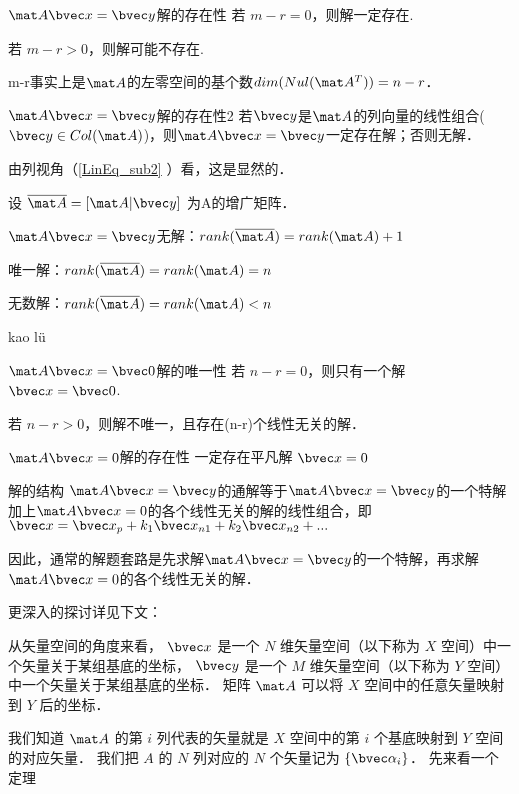 \begin{theorem}{$\mat A \bvec x=\bvec y$解的存在性}
若 $m-r=0$，则解一定存在.

若 $m-r>0$，则解可能不存在.
\end{theorem}
m-r事实上是$\mat A$的左零空间的基个数$dim(Nul(\mat A^T))=n-r$．

\begin{theorem}{$\mat A \bvec x=\bvec y$解的存在性2}
若$\bvec y$是$\mat A$的列向量的线性组合($\bvec y \in Col(\mat A)$)，则$\mat A \bvec x=\bvec y$一定存在解；否则无解．
\end{theorem}
由列视角（\autoref{LinEq_sub2} ）看，这是显然的．

\begin{corollary}{}
设 $\overline{\mat A} = [\mat A | \bvec y] $ 为A的增广矩阵．

$\mat A \bvec x=\bvec y$无解：$rank(\overline{\mat A})=rank(\mat A)+1$

唯一解：$rank(\overline{\mat A})=rank(\mat A)=n$

无数解：$rank(\overline{\mat A})=rank(\mat A)<n$
\end{corollary}
kao lü
\begin{theorem}{$\mat A \bvec x=\bvec 0$解的唯一性}
若 $n-r=0$，则只有一个解 $\bvec x = \bvec 0$.

若 $n-r>0$，则解不唯一，且存在(n-r)个线性无关的解．
\end{theorem}

\begin{theorem}{$\mat A \bvec x=0$解的存在性}
一定存在平凡解 $\bvec x=0$
\end{theorem}

\begin{theorem}{解的结构}
$\mat A \bvec x=\bvec y$的通解等于$\mat A \bvec x=\bvec y$的一个特解加上$\mat A \bvec x=0$的各个线性无关的解的线性组合，即$\bvec x = \bvec x_p +k_1\bvec x_{n1}+k_2\bvec x_{n2}+...$

因此，通常的解题套路是先求解$\mat A \bvec x=\bvec y$的一个特解，再求解$\mat A \bvec x=0$的各个线性无关的解．
\end{theorem}

更深入的探讨详见下文：

从矢量空间的角度来看， $\bvec x$ 是一个 $N$ 维矢量空间（以下称为 $X$ 空间）中一个矢量关于某组基底的坐标， $\bvec y$ 是一个 $M$ 维矢量空间（以下称为 $Y$ 空间）中一个矢量关于某组基底的坐标． 矩阵 $\mat A$ 可以将 $X$ 空间中的任意矢量映射到 $Y$ 后的坐标．

我们知道 $\mat A$ 的第 $i$ 列代表的矢量就是 $X$ 空间中的第 $i$ 个基底映射到 $Y$ 空间的对应矢量． 我们把 $A$ 的 $N$ 列对应的 $N$ 个矢量记为 $\{\bvec \alpha_i\}$． 先来看一个定理

